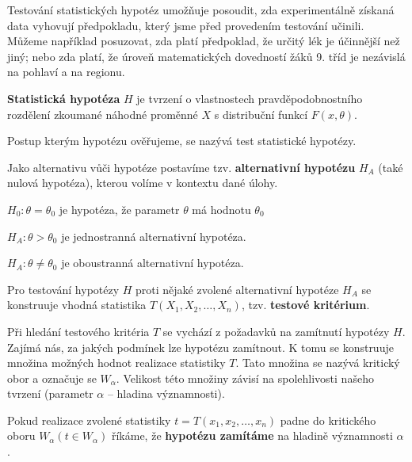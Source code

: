 \begin{compactitem}
    \item Testování statistických hypotéz umožňuje posoudit, zda experimentálně získaná data vyhovují předpokladu, který jsme před provedením testování učinili. Můžeme například posuzovat, zda platí předpoklad, že určitý lék je účinnější než jiný; nebo zda platí, že úroveň matematických dovedností žáků 9. tříd je nezávislá na pohlaví a na regionu.

    \item \textbf{Statistická hypotéza} $H$ je tvrzení o vlastnostech pravděpodobnostního rozdělení zkoumané náhodné proměnné $X$ s distribuční funkcí $F(x, \theta)$. \begin{compactitem}
        \item Postup kterým hypotézu ověřujeme, se nazývá test statistické hypotézy.
    \end{compactitem}

    \item Jako alternativu vůči hypotéze postavíme tzv. \textbf{alternativní hypotézu} $H_A$ (také nulová hypotéza), kterou volíme v kontextu dané úlohy. \begin{compactitem}
        \item $H_0 : \theta = \theta_0$ je hypotéza, že parametr $\theta$ má hodnotu $\theta_0$
        \item $H_A : \theta > \theta_0$ je jednostranná alternativní hypotéza.
        \item $H_A : \theta \not= \theta_0$ je oboustranná alternativní hypotéza.
    \end{compactitem}

    \item Pro testování hypotézy $H$ proti nějaké zvolené alternativní hypotéze $H_A$ se konstruuje vhodná statistika $T(X_1, X_2, \ldots, X_n)$, tzv. \textbf{testové kritérium}.

    \item Při hledání testového kritéria $T$ se vychází z požadavků na zamítnutí hypotézy $H$. Zajímá nás, za jakých podmínek lze hypotézu zamítnout. K tomu se konstruuje množina možných hodnot realizace statistiky $T$. Tato množina se nazývá kritický obor a označuje se $W_{\alpha}$. Velikost této množiny závisí na spolehlivosti našeho tvrzení (parametr $\alpha$ -- hladina významnosti). \begin{compactitem}
        \item Pokud realizace zvolené statistiky $t = T(x_1, x_2, \ldots, x_n)$ padne do kritického oboru $W_{\alpha}(t \in W_{\alpha})$ říkáme, že \textbf{hypotézu zamítáme} na hladině významnosti $\alpha$.
    \end{compactitem}


\end{compactitem}
